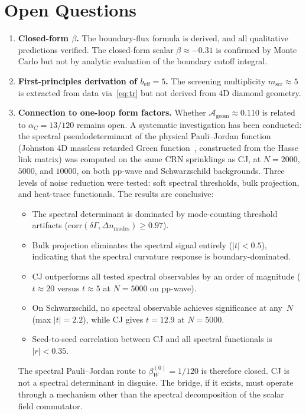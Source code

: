 \documentclass[12pt,a4paper]{article}
\begin{document}
\section{Open Questions}

\begin{enumerate}
\item \textbf{Closed-form $\beta$.} The boundary-flux formula is derived, and all qualitative predictions verified. The closed-form scalar $\beta \approx -0.31$ is confirmed by Monte Carlo but not by analytic evaluation of the boundary cutoff integral.

\item \textbf{First-principles derivation of $b_{\mathrm{eff}} = 5$.} The screening multiplicity $m_{\mathrm{scr}} \approx 5$ is extracted from data via~\eqref{eq:tr} but not derived from 4D diamond geometry.

\item \textbf{Connection to one-loop form factors.} Whether $\mathcal{A}_{\mathrm{geom}} \approx 0.110$ is related to $\alpha_C = 13/120$ remains open. A systematic investigation has been conducted: the spectral pseudodeterminant of the physical Pauli--Jordan function (Johnston 4D massless retarded Green function~\cite{NDS2017}, constructed from the Hasse link matrix) was computed on the same CRN sprinklings as CJ, at $N = 2000$, $5000$, and $10000$, on both pp-wave and Schwarzschild backgrounds. Three levels of noise reduction were tested: soft spectral thresholds, bulk projection, and heat-trace functionals. The results are conclusive:
\begin{itemize}
\item The spectral determinant is dominated by mode-counting threshold artifacts ($\mathrm{corr}(\delta\Gamma, \Delta n_{\mathrm{modes}}) \geq 0.97$).
\item Bulk projection eliminates the spectral signal entirely ($|t| < 0.5$), indicating that the spectral curvature response is boundary-dominated.
\item CJ outperforms all tested spectral observables by an order of magnitude ($t \approx 20$ versus $t \approx 5$ at $N = 5000$ on pp-wave).
\item On Schwarzschild, no spectral observable achieves significance at any~$N$ (max $|t| = 2.2$), while CJ gives $t = 12.9$ at $N = 5000$.
\item Seed-to-seed correlation between CJ and all spectral functionals is $|r| < 0.35$.
\end{itemize}
The spectral Pauli--Jordan route to $\beta_W^{(0)} = 1/120$ is therefore closed. CJ is not a spectral determinant in disguise. The bridge, if it exists, must operate through a mechanism other than the spectral decomposition of the scalar field commutator.
\end{enumerate}
\end{document}
